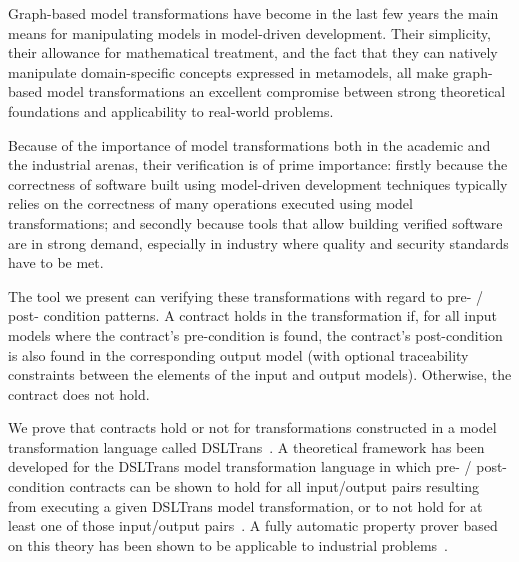 Graph-based model transformations have become in the last few years the main means
for manipulating models in model-driven development. Their simplicity,
their allowance for mathematical treatment, and the fact that they can natively
manipulate domain-specific concepts expressed in metamodels, all make graph-based
model transformations an excellent compromise between strong theoretical
foundations and applicability to real-world problems.

Because of the importance of model transformations both in the academic and the industrial arenas,
their verification is of prime importance: firstly because
the correctness of software built using model-driven development techniques
typically relies on the correctness of many operations executed using model
transformations; and secondly because tools that allow building verified
software are in strong demand, especially in industry where quality and security
standards have to be met.

The tool we present can verifying these transformations with regard to pre- / post- condition patterns. A contract holds in the transformation if, for all input models where the contract's pre-condition
is found, the contract's post-condition is also found in the
corresponding output model (with optional traceability constraints between the
elements of the input and output models). Otherwise, the contract does not hold.

%

We prove that contracts hold or not for transformations constructed in a model transformation language called
DSLTrans~\cite{Barroca2011}.  A theoretical framework has been developed for
the DSLTrans model transformation language in which pre- / post- condition
contracts can be shown to hold for all input/output pairs resulting from executing a given
DSLTrans model transformation, or to not hold for at least one of those
input/output pairs~\cite{Lucio2014}. A fully automatic property prover based on
this theory has been shown to be applicable to industrial
problems~\cite{Selim2014}.


